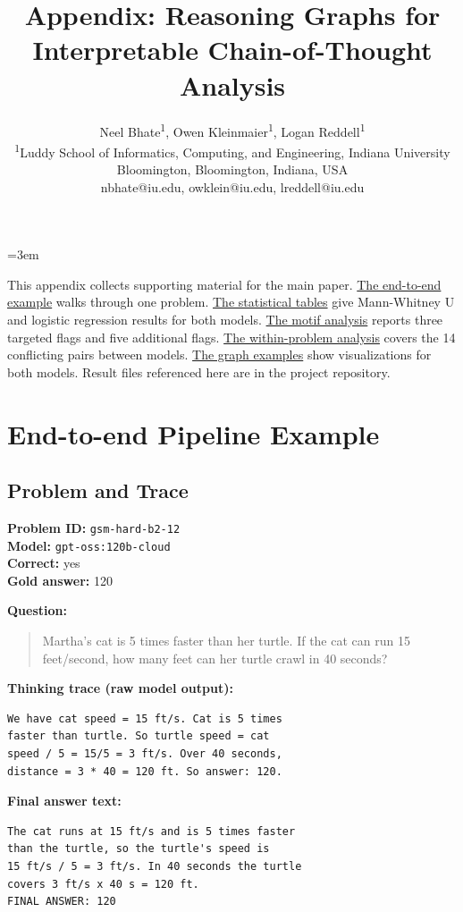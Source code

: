 \documentclass[letterpaper]{article}
\title{Appendix: Reasoning Graphs for\\Interpretable Chain-of-Thought Analysis}
\author{
    Neel Bhate\textsuperscript{\rm 1},
    Owen Kleinmaier\textsuperscript{\rm 1},
    Logan Reddell\textsuperscript{\rm 1}\\
    \textsuperscript{\rm 1}Luddy School of Informatics, Computing, and Engineering, Indiana University Bloomington, Bloomington, Indiana, USA\\
    nbhate@iu.edu, owklein@iu.edu, lreddell@iu.edu
}
\begin{document}
\maketitle
\emergencystretch=3em

\appendix

This appendix collects supporting material for the main paper.
\hyperref[app:walkthrough]{The end-to-end example} walks through one problem.
\hyperref[app:stats]{The statistical tables} give Mann-Whitney U and logistic
regression results for both models.
\hyperref[app:motifs]{The motif analysis} reports three targeted flags and
five additional flags.
\hyperref[app:within]{The within-problem analysis} covers the 14 conflicting
pairs between models.
\hyperref[app:examples]{The graph examples} show visualizations for both
models.
Result files referenced here are in the project repository.

\section{End-to-end Pipeline Example}
\label{app:walkthrough}

\subsection{Problem and Trace}

\noindent \textbf{Problem ID:} \texttt{gsm-hard-b2-12} \\
\textbf{Model:} \texttt{gpt-oss:120b-cloud} \\
\textbf{Correct:} yes \\
\textbf{Gold answer:} 120

\smallskip
\noindent \textbf{Question:}
\begin{quote}
Martha's cat is 5 times faster than her turtle. If the cat can run
15 feet/second, how many feet can her turtle crawl in 40 seconds?
\end{quote}

\noindent \textbf{Thinking trace (raw model output):}
{\small
\begin{verbatim}
We have cat speed = 15 ft/s. Cat is 5 times
faster than turtle. So turtle speed = cat
speed / 5 = 15/5 = 3 ft/s. Over 40 seconds,
distance = 3 * 40 = 120 ft. So answer: 120.
\end{verbatim}
}

\noindent \textbf{Final answer text:}
{\small
\begin{verbatim}
The cat runs at 15 ft/s and is 5 times faster
than the turtle, so the turtle's speed is
15 ft/s / 5 = 3 ft/s. In 40 seconds the turtle
covers 3 ft/s x 40 s = 120 ft.
FINAL ANSWER: 120
\end{verbatim}
}
\end{document}
